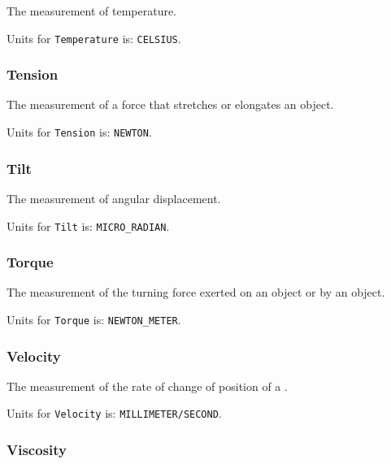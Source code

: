 The measurement of temperature.


Units for \texttt{Temperature} is: \texttt{CELSIUS}.

\FloatBarrier

\subsubsection{Tension}
  \label{sec:Tension}



The measurement of a force that stretches or elongates an object.


Units for \texttt{Tension} is: \texttt{NEWTON}.

\FloatBarrier

\subsubsection{Tilt}
  \label{sec:Tilt}



The measurement of angular displacement.


Units for \texttt{Tilt} is: \texttt{MICRO_RADIAN}.

\FloatBarrier

\subsubsection{Torque}
  \label{sec:Torque}



The measurement of the turning force exerted on an object or by an object.


Units for \texttt{Torque} is: \texttt{NEWTON_METER}.

\FloatBarrier

\subsubsection{Velocity}
  \label{sec:Velocity}



The measurement of the rate of change of position of a .


Units for \texttt{Velocity} is: \texttt{MILLIMETER/SECOND}.

\FloatBarrier

\subsubsection{Viscosity}
  \label{sec:Viscosity}



